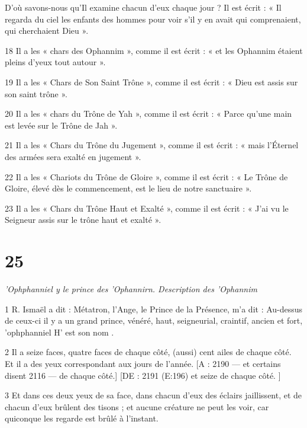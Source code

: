 \par D'où savons-nous qu'Il examine chacun d'eux chaque jour ? Il est écrit : « Il regarda du ciel les enfants des hommes pour voir s'il y en avait qui comprenaient, qui cherchaient Dieu ».

\par 18 Il a les « chars des Ophannim », comme il est écrit : « et les Ophannim étaient pleins d'yeux tout autour ».

\par 19 Il a les « Chars de Son Saint Trône », comme il est écrit : « Dieu est assis sur son saint trône ».

\par 20 Il a les « chars du Trône de Yah », comme il est écrit : « Parce qu'une main est levée sur le Trône de Jah ».

\par 21 Il a les « Chars du Trône du Jugement », comme il est écrit : « mais l'Éternel des armées sera exalté en jugement ».

\par 22 Il a les « Chariots du Trône de Gloire », comme il est écrit : « Le Trône de Gloire, élevé dès le commencement, est le lieu de notre sanctuaire ».

\par 23 Il a les « Chars du Trône Haut et Exalté », comme il est écrit : « J'ai vu le Seigneur assis sur le trône haut et exalté ».

\chapter{25}

\par \textit{'Ophphanniel y le prince des 'Ophannirn. Description des 'Ophannim}

\par 1 R. Ismaël a dit : Métatron, l'Ange, le Prince de la Présence, m'a dit : Au-dessus de ceux-ci il y a un grand prince, vénéré, haut, seigneurial, craintif, ancien et fort, 'ophphanniel H' est son nom .

\par 2 Il a seize faces, quatre faces de chaque côté, (aussi) cent ailes de chaque côté. Et il a des yeux correspondant aux jours de l'année. [A : 2190 — et certains disent 2116 — de chaque côté.] [DE : 2191 (E:196) et seize de chaque côté. ]

\par 3 Et dans ces deux yeux de sa face, dans chacun d'eux des éclairs jaillissent, et de chacun d'eux brûlent des tisons ; et aucune créature ne peut les voir, car quiconque les regarde est brûlé à l'instant.

